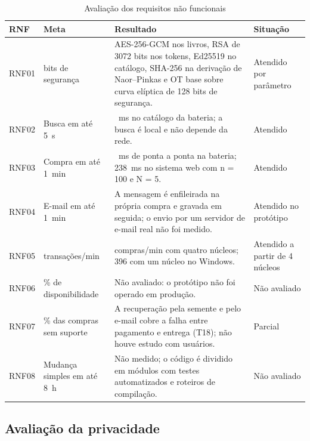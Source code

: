 \begin{table}[H]
\centering
\caption{Avaliação dos requisitos não funcionais}\label{tab:avaliacao-rnf}
\footnotesize
\renewcommand{\arraystretch}{1.2}
\begin{tabularx}{\textwidth}{@{}>{\raggedright\arraybackslash}p{}
  >{\raggedright\arraybackslash}p{} >{\raggedright\arraybackslash}X
  >{\raggedright\arraybackslash}p{}@{}}
\toprule
\textbf{RNF} & \textbf{Meta} & \textbf{Resultado} & \textbf{Situação} \\
\midrule
RNF01 & 128 bits de segurança &
AES-256-GCM nos livros, RSA de 3072 bits nos tokens, Ed25519 no catálogo,
SHA-256 na derivação de Naor--Pinkas e OT base sobre curva elíptica de 128
bits de segurança. & Atendido por parâmetro \\
\addlinespace
RNF02 & Busca em até 5~s & 80~ms no catálogo da bateria; a busca é local e
não depende da rede. & Atendido \\
\addlinespace
RNF03 & Compra em até 1~min & 252~ms de ponta a ponta na bateria; 238~ms no
sistema web com n = 100 e N = 5. & Atendido \\
\addlinespace
RNF04 & E-mail em até 1~min & A mensagem é enfileirada na própria compra e
gravada em seguida; o envio por um servidor de e-mail real não foi medido. &
Atendido no protótipo \\
\addlinespace
RNF05 & 600 transações/min & 1.213 compras/min com quatro núcleos; 396 com um
núcleo no Windows. & Atendido a partir de 4 núcleos \\
\addlinespace
RNF06 & 99\% de disponibilidade & Não avaliado: o protótipo não foi operado em
produção. & Não avaliado \\
\addlinespace
RNF07 & 99\% das compras sem suporte & A recuperação pela semente e pelo
e-mail cobre a falha entre pagamento e entrega (T18); não houve estudo com
usuários. & Parcial \\
\addlinespace
RNF08 & Mudança simples em até 8~h & Não medido; o código é dividido em
módulos com testes automatizados e roteiros de compilação. & Não avaliado \\
\bottomrule
\end{tabularx}
\end{table}

\subsection{Avaliação da privacidade}

